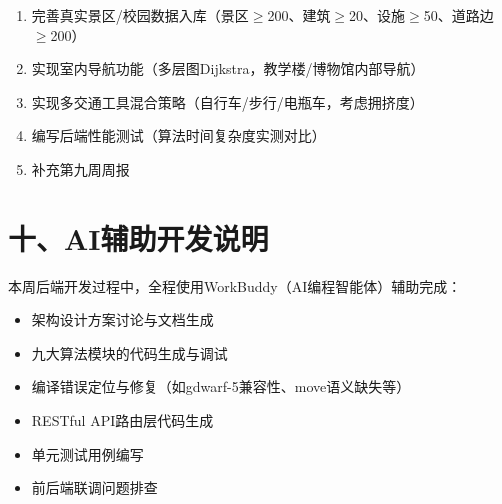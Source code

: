 \documentclass[12pt,a4paper]{article}
\begin{document}
\begin{enumerate}[leftmargin=2em]
    \item 完善真实景区/校园数据入库（景区$\geq$200、建筑$\geq$20、设施$\geq$50、道路边$\geq$200）
    \item 实现室内导航功能（多层图Dijkstra，教学楼/博物馆内部导航）
    \item 实现多交通工具混合策略（自行车/步行/电瓶车，考虑拥挤度）
    \item 编写后端性能测试（算法时间复杂度实测对比）
    \item 补充第九周周报
\end{enumerate}

\section*{十、AI辅助开发说明}

本周后端开发过程中，全程使用WorkBuddy（AI编程智能体）辅助完成：
\begin{itemize}[leftmargin=2em]
    \item 架构设计方案讨论与文档生成
    \item 九大算法模块的代码生成与调试
    \item 编译错误定位与修复（如gdwarf-5兼容性、move语义缺失等）
    \item RESTful API路由层代码生成
    \item 单元测试用例编写
    \item 前后端联调问题排查
\end{itemize}
\end{document}
